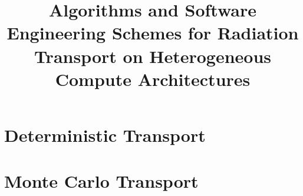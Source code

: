 \documentclass[11pt,onehalf]{beavtex}
\title{Algorithms and Software Engineering Schemes for Radiation Transport on Heterogeneous Compute Architectures}
\author{\TheAuthors{}}
\newcommand{\TheAuthors}{Joanna Piper Morgan}
\begin{document}
\maketitle

\mainmatter



\newcommand{\TheTitle}{BLANK}
\renewcommand{\TheAuthors}{BLANK}
\newcommand{\TheAddress}{BLANK}





\part{Deterministic Transport}
\label{part:determ}






\part{Monte Carlo Transport}
\label{part:mc}









\newpage



\printbibliography[]


\appendix


\newpage

\newpage

\end{document}
